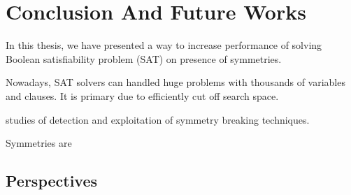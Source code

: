 \chapter{Conclusion And Future Works}\label{chap:conclu}



In this thesis, we have presented a way to increase performance of solving Boolean satisfiability problem (SAT)
on presence of symmetries. 

Nowadays, SAT solvers can handled huge problems with thousands of variables and clauses. 
It is primary due to efficiently cut off search space.

studies of detection and exploitation of symmetry breaking techniques.

Symmetries are 



\section{Perspectives}



